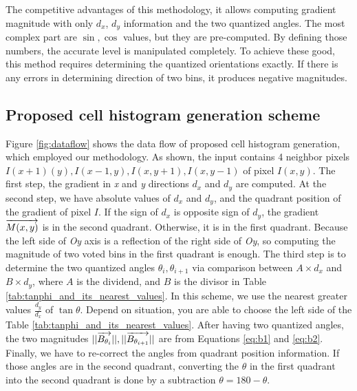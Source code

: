 The competitive advantages of this methodology, it  allows computing gradient
magnitude  with only $d_x$, $d_y$ information and the two quantized angles.
The most complex part are $\sin, \cos$ values, but they are
pre-computed.
By defining those numbers, the accurate level is manipulated completely.
To achieve these good, this method requires determining the quantized
orientations exactly.
If there is any errors in determining direction of two bins, it produces negative magnitudes.

\subsection{Proposed cell histogram generation scheme}
\label{sub:proposed_cell_histogram_generation_scheme}
Figure \ref{fig:dataflow}  shows the data flow of proposed cell histogram
generation, which employed our methodology.
As shown, the input contains 4 neighbor pixels $I(x+1)(y), I(x-1,y), I(x, y +
1), I(x, y - 1)$  of pixel $I(x,y)$.
The first step, the gradient in \textit{x} and \textit{y} directions  $d_x$ and $d_y$ are computed.
At the second step, we have absolute values of $d_x$ and $d_y$, and the
quadrant position of the gradient of pixel $I$.
If the sign of $d_x$ is opposite  sign of $d_y$, the gradient $\overrightarrow{M(x,y)}$ is in
the second quadrant.
Otherwise, it is in the first quadrant.
Because the left side of \textit{Oy} axis is a reflection of the right side of
\textit{Oy}, so computing the magnitude of two voted bins in the first quadrant
is enough.
The third step is to determine the two quantized angles $\theta_i, \theta_{i+1}$ via comparison
between $A \times d_x$ and $B \times d_y$, where $A$ is the dividend,
and $B$ is the divisor in Table
\ref{tab:tanphi_and_its_nearest_values}.
In this scheme, we use the nearest greater values
$\frac{d_y}{d_x}$ of $\tan\theta$.
Depend on situation, you are able to choose the left side of the Table
\ref{tab:tanphi_and_its_nearest_values}.
After having two quantized angles, the two magnitudes $||\overrightarrow{B_{\theta_i}}||, ||\overrightarrow{B_{\theta_{i+1}}}||$ are from
Equations \ref{eq:b1} and \ref{eq:b2}.
Finally, we have to re-correct the angles from quadrant position information.
If those angles are in the second quadrant, converting  the $\theta$ in the first
quadrant into the second quadrant is done by a subtraction $\theta = 180 - \theta$.

